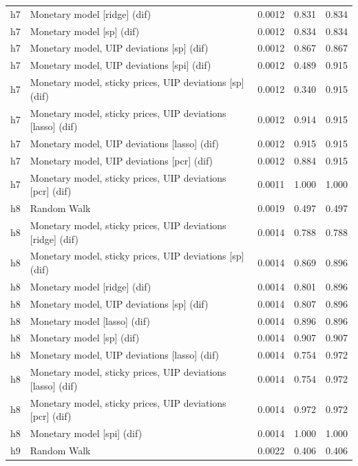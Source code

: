 \begin{ThreePartTable}
\begin{longtable}[t]{cp{5.5cm}ccc}
h7 & \raggedright Monetary model [ridge] (dif) & 0.0012 & 0.831 & 0.834\\
h7 & \raggedright Monetary model [sp] (dif) & 0.0012 & 0.834 & 0.834\\
h7 & \raggedright Monetary model, UIP deviations [sp] (dif) & 0.0012 & 0.867 & 0.867\\
h7 & \raggedright Monetary model, UIP deviations [spi] (dif) & 0.0012 & 0.489 & 0.915\\
h7 & \raggedright Monetary model, sticky prices, UIP deviations [sp] (dif) & 0.0012 & 0.340 & 0.915\\
h7 & \raggedright Monetary model, sticky prices, UIP deviations [lasso] (dif) & 0.0012 & 0.914 & 0.915\\
h7 & \raggedright Monetary model, UIP deviations [lasso] (dif) & 0.0012 & 0.915 & 0.915\\
h7 & \raggedright Monetary model, UIP deviations [pcr] (dif) & 0.0012 & 0.884 & 0.915\\
h7 & \raggedright Monetary model, sticky prices, UIP deviations [pcr] (dif) & 0.0011 & 1.000 & 1.000\\
\addlinespace
h8 & \raggedright Random Walk & 0.0019 & 0.497 & 0.497\\
h8 & \raggedright Monetary model, sticky prices, UIP deviations [ridge] (dif) & 0.0014 & 0.788 & 0.788\\
h8 & \raggedright Monetary model, sticky prices, UIP deviations [sp] (dif) & 0.0014 & 0.869 & 0.896\\
h8 & \raggedright Monetary model [ridge] (dif) & 0.0014 & 0.801 & 0.896\\
h8 & \raggedright Monetary model, UIP deviations [sp] (dif) & 0.0014 & 0.807 & 0.896\\
h8 & \raggedright Monetary model [lasso] (dif) & 0.0014 & 0.896 & 0.896\\
h8 & \raggedright Monetary model [sp] (dif) & 0.0014 & 0.907 & 0.907\\
h8 & \raggedright Monetary model, UIP deviations [lasso] (dif) & 0.0014 & 0.754 & 0.972\\
h8 & \raggedright Monetary model, sticky prices, UIP deviations [lasso] (dif) & 0.0014 & 0.754 & 0.972\\
h8 & \raggedright Monetary model, sticky prices, UIP deviations [pcr] (dif) & 0.0014 & 0.972 & 0.972\\
h8 & \raggedright Monetary model [spi] (dif) & 0.0014 & 1.000 & 1.000\\
\addlinespace
h9 & \raggedright Random Walk & 0.0022 & 0.406 & 0.406\\

\end{longtable}
\end{ThreePartTable}
